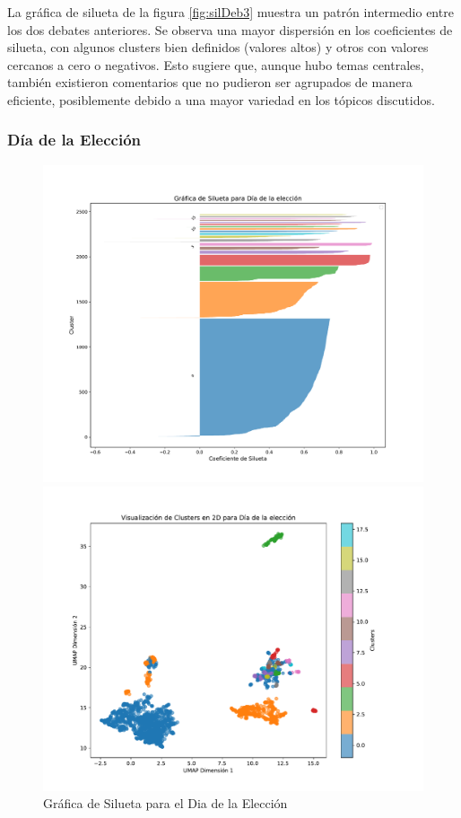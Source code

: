 \documentclass[10pt, a4paper]{article}
\begin{document}
	La gráfica de silueta de la figura \ref{fig:silDeb3} muestra un patrón intermedio entre los dos debates anteriores. Se observa una mayor dispersión en los coeficientes de silueta, con algunos clusters bien definidos (valores altos) y otros con valores cercanos a cero o negativos. Esto sugiere que, aunque hubo temas centrales, también existieron comentarios que no pudieron ser agrupados de manera eficiente, posiblemente debido a una mayor variedad en los tópicos discutidos.
	
	\subsubsection{Día de la Elección}

	\begin{figure}[h!]
		\centering
		\begin{minipage}{0.49\textwidth} %
			\includegraphics[width=\linewidth]{silhouette_diaEleccion.pdf} 
			\caption{Gráfica de Silueta para el Dia de la Elección}
			\label{fig:silDiaEleccion}
		\end{minipage}
		\hfill %
		\begin{minipage}{0.49\textwidth}
			\includegraphics[width=\linewidth]{clusters_diaElección.pdf}

\end{minipage}
\end{figure}
\end{document}
